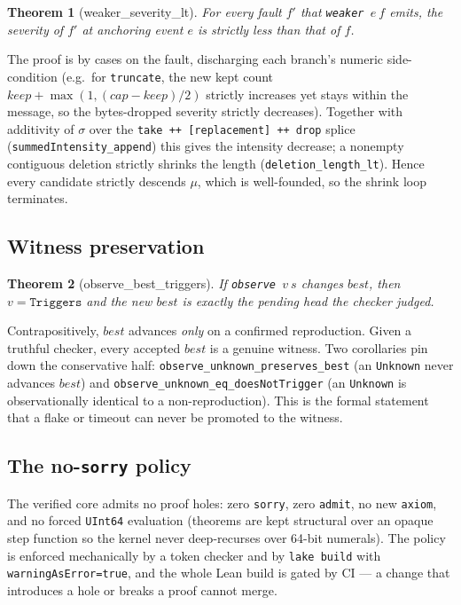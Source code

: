 \documentclass[10pt,twocolumn,letterpaper]{article}
\newtheorem{theorem}{Theorem}
\newcommand{\tool}[1]{\texttt{#1}}
\begin{document}
\begin{theorem}[weaker\_severity\_lt]
For every fault $f'$ that \texttt{weaker}~$e~f$ emits, the severity of $f'$ at
anchoring event $e$ is strictly less than that of $f$.
\end{theorem}
The proof is by cases on the fault, discharging each branch's numeric
side-condition (e.g.\ for \tool{truncate}, the new kept count
$keep + \max(1, (\mathit{cap} - keep)/2)$ strictly increases yet stays within the
message, so the bytes-dropped severity strictly decreases). Together with
additivity of $\sigma$ over the \texttt{take ++ [replacement] ++ drop} splice
(\texttt{summedIntensity\_append}) this gives the intensity decrease; a nonempty
contiguous deletion strictly shrinks the length (\texttt{deletion\_length\_lt}).
Hence every candidate strictly descends $\mu$, which is well-founded, so the
shrink loop terminates.

\subsection{Witness preservation}
\begin{theorem}[observe\_best\_triggers]
If \texttt{observe}~$v~s$ changes $\mathit{best}$, then $v = \mathtt{Triggers}$
and the new $\mathit{best}$ is exactly the pending head the checker judged.
\end{theorem}
Contrapositively, $\mathit{best}$ advances \emph{only} on a confirmed
reproduction. Given a truthful checker, every accepted $\mathit{best}$ is a
genuine witness. Two corollaries pin down the conservative half:
\texttt{observe\_unknown\_preserves\_best} (an \texttt{Unknown} never advances
$\mathit{best}$) and \texttt{observe\_unknown\_eq\_doesNotTrigger} (an
\texttt{Unknown} is observationally identical to a non-reproduction). This is the
formal statement that a flake or timeout can never be promoted to the witness.

\subsection{The no-\texttt{sorry} policy}
The verified core admits no proof holes: zero \texttt{sorry}, zero
\texttt{admit}, no new \texttt{axiom}, and no forced \texttt{UInt64} evaluation
(theorems are kept structural over an opaque step function so the kernel never
deep-recurses over 64-bit numerals). The policy is enforced mechanically by a
token checker and by \texttt{lake build} with \texttt{warningAsError=true}, and
the whole Lean build is gated by CI --- a change that introduces a hole or breaks
a proof cannot merge.
\end{document}
